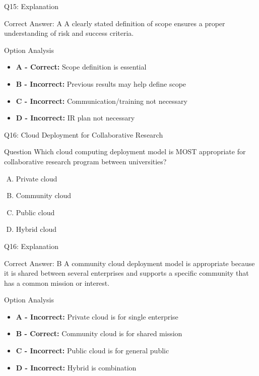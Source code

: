 \documentclass{beamer}
\begin{document}
	\begin{frame}{Q15: Explanation}
		\begin{block}{Correct Answer: A}
			A clearly stated definition of scope ensures a proper understanding of risk and success criteria.
		\end{block}
		\begin{block}{Option Analysis}
			\begin{itemize}
				\item \textbf{A - Correct:} Scope definition is essential
				\item \textbf{B - Incorrect:} Previous results may help define scope
				\item \textbf{C - Incorrect:} Communication/training not necessary
				\item \textbf{D - Incorrect:} IR plan not necessary
			\end{itemize}
		\end{block}
	\end{frame}
	
	\begin{frame}{Q16: Cloud Deployment for Collaborative Research}
		\begin{block}{Question}
			Which cloud computing deployment model is MOST appropriate for collaborative research program between universities?
		\end{block}
		\begin{enumerate}[(A)]
			\item Private cloud
			\item Community cloud
			\item Public cloud
			\item Hybrid cloud
		\end{enumerate}
	\end{frame}
	
	\begin{frame}{Q16: Explanation}
		\begin{block}{Correct Answer: B}
			A community cloud deployment model is appropriate because it is shared between several enterprises and supports a specific community that has a common mission or interest.
		\end{block}
		\begin{block}{Option Analysis}
			\begin{itemize}
				\item \textbf{A - Incorrect:} Private cloud is for single enterprise
				\item \textbf{B - Correct:} Community cloud is for shared mission
				\item \textbf{C - Incorrect:} Public cloud is for general public
				\item \textbf{D - Incorrect:} Hybrid is combination
			\end{itemize}
		\end{block}
	\end{frame}
	
\end{document}
